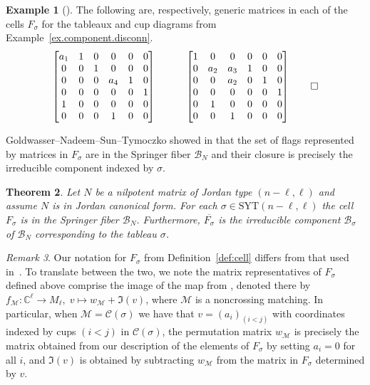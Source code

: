 \documentclass[11pt]{amsart}
\newtheorem{theorem}{Theorem}[section]
\theoremstyle{remark}
\newtheorem{remark}[theorem]{Remark}
\theoremstyle{remark}
\theoremstyle{definition}
\theoremstyle{definition}
\theoremstyle{definition}
\newtheorem{eg_no_qed}[theorem]{Example}
\newenvironment{ex}[1][]{\begin{eg_no_qed}[#1]\renewcommand{\qedsymbol}{$\Diamond$}\pushQED{\qed}}{\popQED\end{eg_no_qed}}
\numberwithin{equation}{section}
\newcommand{\C}{\mathbb{C}}           %
\newcommand{\gs}{\sigma}
\newcommand{\cb}{\mathcal{B}}
\newcommand{\cc}{\mathcal{C}}
\newcommand{\SYT}{\mathrm{SYT}}
\newcommand{\SF}{\mathcal{B}}
\newcommand{\cupsigma}{\cc(\gs)}
\newcommand{\cell}{F_\gs}
\begin{document}
\begin{ex} The following are, respectively, generic matrices in each of the cells $\cell$ for the tableaux and cup diagrams from Example~\ref{ex.component.disconn}.   
\[\begin{bmatrix}
a_1&1&0&0&0&0\\
0&0&1&0&0&0\\  
0&0&0&a_4&1&0\\ 
0&0&0&0&0&1\\ 
1&0&0&0&0&0\\ 
0&0&0&1&0&0
\end{bmatrix} \quad\quad\quad \begin{bmatrix}
1&0&0&0&0&0\\
0&a_2&a_3&1&0&0\\  
0&0&a_2&0&1&0\\ 
0&0&0&0&0&1\\ 
0&1&0&0&0&0\\ 
0&0&1&0&0&0
\end{bmatrix} \qedhere
\]
\end{ex}




Goldwasser--Nadeem--Sun--Tymoczko showed in \cite[Theorem 4.10]{GNGT2025} that the set of flags represented by matrices in $\cell$ are in the Springer fiber $\cb_N$ and their closure is precisely the irreducible component indexed by $\gs$. 


\begin{theorem}\label{thm.GNST}
Let $N$ be a nilpotent matrix of Jordan type $(n-\ell,\ell)$ and assume $N$ is in Jordan canonical form. For each $\gs\in \SYT(n-\ell, \ell)$ the cell $\cell$ is in the Springer fiber $\cb_N$. Furthermore, $\overline{F_\sigma}$ is the irreducible component $\SF_\gs$ of $\cb_N$ corresponding to the tableau $\sigma$.  
\end{theorem}





\begin{remark}
Our notation for $\cell$ from Definition~\ref{def:cell} differs from that used in~\cite{GNGT2025}. To translate between the two, we note the matrix representatives of $\cell$ defined above comprise the image of the map from \cite[Definition 4.3]{GNGT2025}, denoted there by  $f_\mathcal{M}: \C^\ell \to M_\ell,\; v \mapsto w_\mathcal{M}+\Im({v})$, where $\mathcal{M}$ is a noncrossing matching.  In particular, when $\mathcal{M}= \cupsigma$ we have that $v=(a_i)_{(i<j)}$ with coordinates indexed by cups $(i<j)$ in $\cupsigma$, the permutation matrix $w_{\mathcal{M}}$ is precisely the matrix obtained from our description of the elements of $\cell$ by setting $a_i=0$ for all $i$, and $\Im(v)$ is obtained by subtracting $w_\mathcal{M}$ from the matrix in $\cell$ determined by $v$.
\end{remark}
\end{document}
